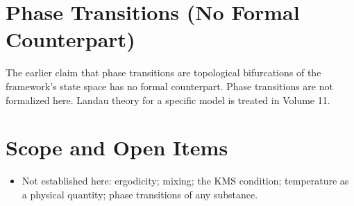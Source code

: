 \documentclass[11pt, a4paper]{article}
\begin{document}
\section{Phase Transitions (No Formal Counterpart)}
The earlier claim that phase transitions are topological bifurcations of the framework's state space has no formal counterpart. Phase transitions are not formalized here. Landau theory for a specific model is treated in Volume 11.

\section{Scope and Open Items}
\begin{itemize}
  \item Not established here: ergodicity; mixing; the KMS condition; temperature as a physical quantity; phase transitions of any substance.
\end{itemize}
\end{document}
